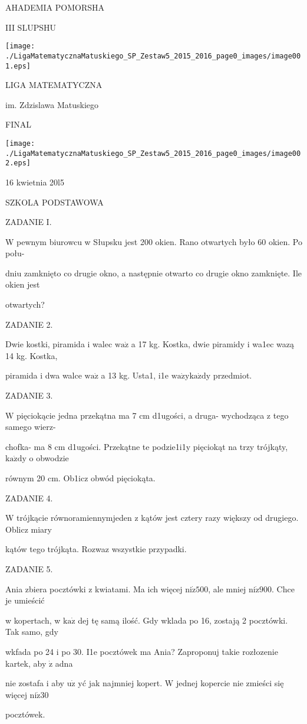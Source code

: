 \documentclass[a4paper,12pt]{article}
\begin{document}
AHADEMIA POMORSHA

III SLUPSHU
\begin{center}
\texttt{[image: ./LigaMatematycznaMatuskiego\_SP\_Zestaw5\_2015\_2016\_page0\_images/image001.eps]}
\end{center}
LIGA MATEMATYCZNA

im. Zdzislawa Matuskiego

FINAL
\begin{center}
\texttt{[image: ./LigaMatematycznaMatuskiego\_SP\_Zestaw5\_2015\_2016\_page0\_images/image002.eps]}
\end{center}
16 kwietnia 20l5

SZKOLA PODSTAWOWA

ZADANIE I.

W pewnym biurowcu w Słupsku jest 200 okien. Rano otwartych było 60 okien. Po połu-

dniu zamknięto co drugie okno, a następnie otwarto co drugie okno zamknięte. Ile okien jest

otwartych?

ZADANIE 2.

Dwie kostki, piramida i walec $\mathrm{w}\mathrm{a}\dot{\mathrm{z}}$ a 17 kg. Kostka, dwie piramidy i wa1ec wazą 14 kg. Kostka,

piramida i dwa walce $\mathrm{w}\mathrm{a}\dot{\mathrm{z}}$ a 13 kg. Usta1, i1e $\mathrm{w}\mathrm{a}\dot{\mathrm{z}}\mathrm{y}\mathrm{k}\mathrm{a}\dot{\mathrm{z}}\mathrm{d}\mathrm{y}$ przedmiot.

ZADANIE 3.

$\mathrm{W}$ pięciokącie jedna przekątna ma 7 cm d1ugości, a druga- wychodząca z tego samego wierz-

chofka- ma 8 cm d1ugości. Przekątne te podzie1i1y pięciokąt na trzy trójkąty, $\mathrm{k}\mathrm{a}\dot{\mathrm{z}}\mathrm{d}\mathrm{y}$ o obwodzie

równym 20 cm. Ob1icz obwód pięciokąta.

ZADANIE 4.

W trójkącie równoramiennymjeden z kątów jest cztery razy większy od drugiego. Oblicz miary

kątów tego trójkąta. Rozwaz wszystkie przypadki.

ZADANIE 5.

Ania zbiera pocztówki z kwiatami. Ma ich więcej $\mathrm{n}\mathrm{i}\dot{\mathrm{z}}500$, ale mniej $\mathrm{n}\mathrm{i}\dot{\mathrm{z}}900$. Chce je umieścić

w kopertach, w $\mathrm{k}\mathrm{a}\dot{\mathrm{z}}$ dej tę samą ilość. Gdy wklada po 16, zostają 2 pocztówki. Tak samo, gdy

wkfada po 24 i po 30. I1e pocztówek ma Ania? Zaproponuj takie rozłozenie kartek, aby $\dot{\mathrm{z}}$ adna

nie zostafa i aby $\mathrm{u}\dot{\mathrm{z}}$ yć jak najmniej kopert. $\mathrm{W}$ jednej kopercie nie zmieści się więcej $\mathrm{n}\mathrm{i}\dot{\mathrm{z}} 30$

pocztówek.
\end{document}

